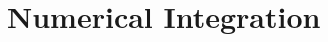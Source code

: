 \section{Numerical Integration} \label{S:5.6.NumInt}



\newpage



\newpage



\newpage



\newpage

\clearpage
